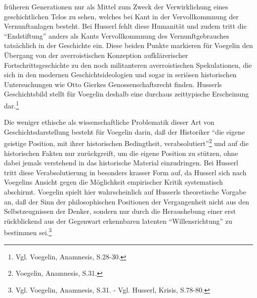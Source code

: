 früheren Generationen nur als Mittel zum Zweck der Verwirklichung eines
geschichtlichen Telos zu sehen, welches bei Kant in der Vervollkommnung der
Vernunftanlagen besteht. Bei Husserl fehlt diese Humanität und zudem tritt die
"`Endstiftung"' anders als Kants Vervollkommnung des Vernunftgebrauches
tatsächlich in der Geschichte ein. Diese beiden Punkte markieren für Voegelin
den Übergang von der averroistischen Konzeption aufklärerischer
Fortschrittsgeschichte zu den noch militanteren averroistischen Spekulationen,
die sich in den modernen Geschichtsideologien und sogar in seriösen
historischen Untersuchungen wie Otto Gierkes Genossenschaftsrecht finden.
Husserls Geschichtsbild stellt für Voegelin deshalb eine durchaus
zeittypische Erscheinung dar.\footnote{Vgl. Voegelin, Anamnesis, S.28-30.}

Die weniger ethische als wissenschaftliche Problematik dieser Art von
Geschichtsdarstellung besteht für Voegelin darin, daß der Historiker "`die
eigene geistige Position, mit ihrer historischen Bedingtheit,
verabsolutiert"'\footnote{Voegelin, Anamnesis, S.31.}  und auf die
historischen Fakten nur zurückgreift, um die eigene Position zu stützen, ohne
dabei jemals verstehend in das historische Material einzudringen. Bei Husserl
tritt diese Verabsolutierung in besonders krasser Form auf, da Husserl sich
nach Voegelins Ansicht gegen die Möglichkeit empirischer Kritik systematisch
abschirmt. Voegelin spielt hier wahrscheinlich auf Husserls theoretische
Vorgabe an, daß der Sinn der philosophischen Positionen der Vergangenheit
nicht aus den Selbstzeugnissen der Denker, sondern nur durch die Heraushebung
einer erst rückblickend aus der Gegenwart erkennbaren latenten
"`Willensrichtung"' zu bestimmen sei.\footnote{Vgl.  Voegelin, Anamnesis,
  S.31. - Vgl. Husserl, Krisis, S.78-80.}

